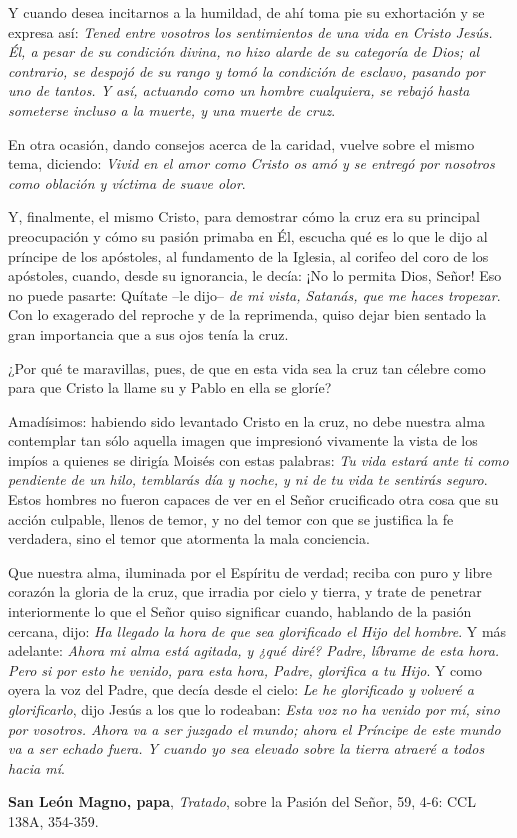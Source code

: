 \begin{body}
\newpage 
Y cuando desea incitarnos a la humildad, de ahí toma pie su exhortación y se expresa así: \textit{Tened entre vosotros los sentimientos de una vida en Cristo Jesús. Él, a pesar de su condición divina, no hizo alarde de su categoría de Dios; al contrario, se despojó de su rango y tomó la condición de esclavo, pasando por uno de tantos. Y así, actuando como un hombre cualquiera, se rebajó hasta someterse incluso a la muerte, y una muerte de cruz}.

En otra ocasión, dando consejos acerca de la caridad, vuelve sobre el mismo tema, diciendo: \textit{Vivid en el amor como Cristo os amó y se entregó por nosotros como oblación y víctima de suave olor}.

Y, finalmente, el mismo Cristo, para demostrar cómo la cruz era su principal preocupación y cómo su pasión primaba en Él, escucha qué es lo que le dijo al príncipe de los apóstoles, al fundamento de la Iglesia, al corifeo del coro de los apóstoles, cuando, desde su ignorancia, le decía: ¡No lo permita Dios, Señor! Eso no puede pasarte: Quítate –le dijo– \textit{de mi vista, Satanás, que me haces tropezar}. Con lo exagerado del reproche y de la reprimenda, quiso dejar bien sentado la gran importancia que a sus ojos tenía la cruz.

¿Por qué te maravillas, pues, de que en esta vida sea la cruz tan célebre como para que Cristo la llame su  y Pablo en ella se gloríe?
\end{body}

\begin{patercite}
[\ldots]
	
Amadísimos: habiendo sido levantado Cristo en la cruz, no debe nuestra alma contemplar tan sólo aquella imagen que impresionó vivamente la vista de los impíos a quienes se dirigía Moisés con estas palabras: \textit{Tu vida estará ante ti como pendiente de un hilo, temblarás día y noche, y ni de tu vida te sentirás seguro}. Estos hombres no fueron capaces de ver en el Señor crucificado otra cosa que su acción culpable, llenos de temor, y no del temor con que se justifica la fe verdadera, sino el temor que atormenta la mala conciencia.

Que nuestra alma, iluminada por el Espíritu de verdad; reciba con puro y libre corazón la gloria de la cruz, que irradia por cielo y tierra, y trate de penetrar interiormente lo que el Señor quiso significar cuando, hablando de la pasión cercana, dijo: \textit{Ha llegado la hora de que sea glorificado el Hijo del hombre}. Y más adelante: \textit{Ahora mi alma está agitada, y ¿qué diré? Padre, líbrame de esta hora. Pero si por esto he venido, para esta hora, Padre, glorifica a tu Hijo}. Y como oyera la voz del Padre, que decía desde el cielo: \textit{Le he glorificado y volveré a glorificarlo}, dijo Jesús a los que lo rodeaban: \textit{Esta voz no ha venido por mí, sino por vosotros. Ahora va a ser juzgado el mundo; ahora el Príncipe de este mundo va a ser echado fuera. Y cuando yo sea elevado sobre la tierra atraeré a todos hacia mí}.
	
\textbf{San León Magno, papa}, \textit{Tratado}, sobre la Pasión del Señor, 59, 4-6: CCL 138A, 354-359.
\end{patercite}

